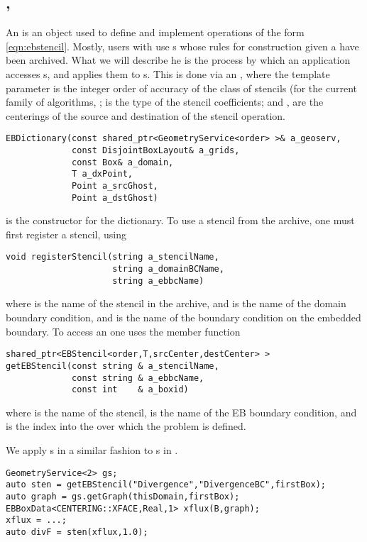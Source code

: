 \documentclass[12pt]{article}
\begin{document}
\subsection{, }
An  is an object used to define and implement operations of the form \eqref{eqn:ebstencil}. Mostly, users with use s whose rules for construction given a  have been archived. What we will describe he is the process by which an application accesses s, and applies them to s. 
This is done via an , where the template parameter  is the integer order of accuracy of the class of stencils (for the current family of algorithms, ;  is the type of the stencil coefficients; and ,  are the centerings of the source and destination of the stencil operation. 
\begin{verbatim}
EBDictionary(const shared_ptr<GeometryService<order> >& a_geoserv,
             const DisjointBoxLayout& a_grids,
             const Box& a_domain,
             T a_dxPoint,   
             Point a_srcGhost,  
             Point a_dstGhost)
\end{verbatim}
is the constructor for the dictionary. To use a stencil from the archive, one must first register a stencil, using
\begin{verbatim}
void registerStencil(string a_stencilName,
                     string a_domainBCName,
                     string a_ebbcName)
\end{verbatim}
where  is the name of the stencil in the archive, and  is the name of the domain boundary condition, and
 is the name of the boundary condition on the embedded boundary. To access an  one uses the  member function
\begin{verbatim}
shared_ptr<EBStencil<order,T,srcCenter,destCenter> >
getEBStencil(const string & a_stencilName, 
             const string & a_ebbcName, 
             const int    & a_boxid)
\end{verbatim}
where  is the name of the stencil,  is the name of the EB boundary condition, and  is the index into the  over which the problem is defined.

We apply s in a similar fashion to s in .
\begin{verbatim}
GeometryService<2> gs;
auto sten = getEBStencil("Divergence","DivergenceBC",firstBox);
auto graph = gs.getGraph(thisDomain,firstBox);
EBBoxData<CENTERING::XFACE,Real,1> xflux(B,graph);
xflux = ...;
auto divF = sten(xflux,1.0);
\end{verbatim}
\end{document}

